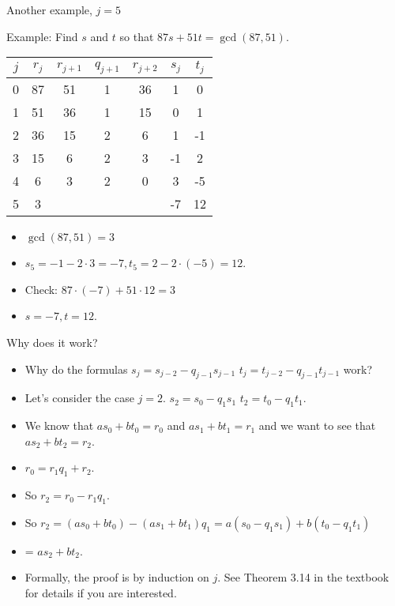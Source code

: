 \documentclass{beamer}
\begin{document}
\begin{frame}{Another example, $j=5$}

Example: Find $s$ and $t$ so that $87s+51t = \gcd(87, 51)$.

\vspace{1em}

\begin{tabular}{|c|c|c|c|c|c|c|}\hline
$j$   &  $r_{j}$    & $r_{j+1}$ & $q_{j+1}$ & $r_{j+2}$ & $s_j$ & $t_j$ \\ \hline\hline
0     &  87         &  51       &    1      &   36      &  1    &   0   \\ \hline
1     &  51         &  36       &    1      &   15      &  0    &   1   \\ \hline
2     &  36         &  15       &    2      &    6      &  1    &  -1   \\ \hline
3     &  15         &   6       &    2      &    3      & -1    &   2   \\ \hline
4     &   6         &   3       &    2      &    0      &  3    &  -5   \\ \hline
5     &   3         &           &           &           & -7    &  12   \\ \hline
\end{tabular}

\vspace{1em}

\begin{itemize}
  \item $\gcd(87,51) = 3$
  \item $s_5 = -1 - 2\cdot 3 = -7, t_5 = 2 - 2\cdot (-5) = 12$.
  \item Check: $87\cdot (-7) + 51\cdot 12 = 3$
  \item $s=-7, t=12$.
\end{itemize}


\end{frame}


\beamerdefaultoverlayspecification{<+->}

\begin{frame}{Why does it work?}
\begin{itemize}
\item Why do the formulas  $s_j=s_{j-2} - q_{j-1}s_{j-1}$ \quad $t_j=t_{j-2} - q_{j-1}t_{j-1}$ work?
\item Let's consider the case $j=2$. $s_2=s_0 - q_1s_1$ \quad $t_2=t_0 - q_1t_1$.
\item We know that $a s_0+bt_0 = r_0$ and $a s_1 + b t_1 = r_1$ and we want to see that $as_2+bt_2=r_2$.
\item $r_0 = r_1 q_1 + r_2$.
\item So $r_2 = r_0 - r_1 q_1$.
\item So $r_2 = (a s_0+bt_0) - (a s_1 + b t_1)q_1 = a(s_0 - q_1 s_1) + b(t_0 - q_1 t_1)$
\item = $as_2 + b t_2$.
\item Formally, the proof is by induction on $j$. See Theorem 3.14 in the textbook for details if you are interested.

\end{itemize}
\end{frame}
\end{document}
